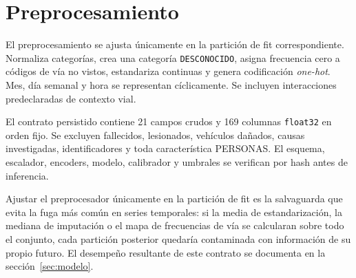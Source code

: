 \section{Preprocesamiento}\label{sec:preprocesamiento}

El preprocesamiento se ajusta únicamente en la partición de fit correspondiente. Normaliza categorías, crea una categoría \texttt{DESCONOCIDO}, asigna frecuencia cero a códigos de vía no vistos, estandariza continuas y genera codificación \emph{one-hot}. Mes, día semanal y hora se representan cíclicamente. Se incluyen interacciones predeclaradas de contexto vial.

El contrato persistido contiene 21 campos crudos y 169 columnas \texttt{float32} en orden fijo. Se excluyen fallecidos, lesionados, vehículos dañados, causas investigadas, identificadores y toda característica PERSONAS. El esquema, escalador, encoders, modelo, calibrador y umbrales se verifican por hash antes de inferencia.

Ajustar el preprocesador únicamente en la partición de fit es la salvaguarda que evita la fuga más común en series temporales: si la media de estandarización, la mediana de imputación o el mapa de frecuencias de vía se calcularan sobre todo el conjunto, cada partición posterior quedaría contaminada con información de su propio futuro. El desempeño resultante de este contrato se documenta en la sección~\ref{sec:modelo}.
